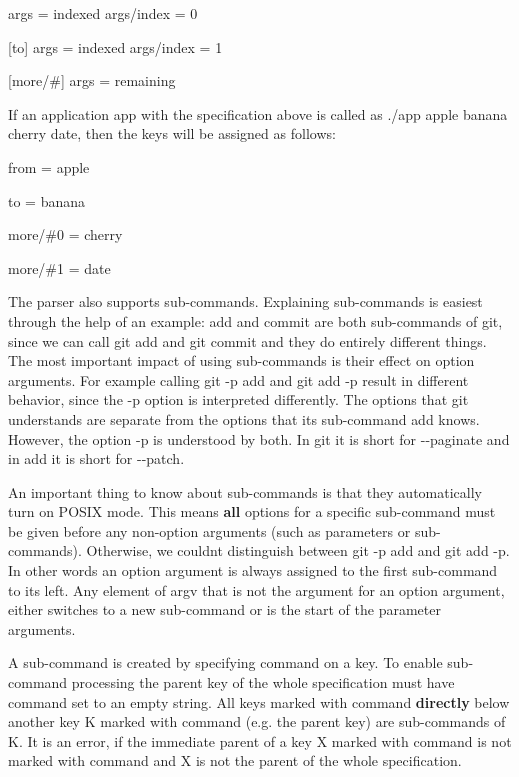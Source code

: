 \begin{DoxyCode}
[from]
args = indexed
args/index = 0

[to]
args = indexed
args/index = 1

[more/#]
args = remaining
\end{DoxyCode}


If an application {\ttfamily app} with the specification above is called as {\ttfamily ./app apple banana cherry date}, then the keys will be assigned as follows\+:


\begin{DoxyItemize}
\item {\ttfamily from = apple}
\item {\ttfamily to = banana}
\item {\ttfamily more/\#0 = cherry}
\item {\ttfamily more/\#1 = date}
\end{DoxyItemize}

The parser also supports sub-\/commands. Explaining sub-\/commands is easiest through the help of an example\+: {\ttfamily add} and {\ttfamily commit} are both sub-\/commands of {\ttfamily git}, since we can call {\ttfamily git add} and {\ttfamily git commit} and they do entirely different things. The most important impact of using sub-\/commands is their effect on option arguments. For example calling {\ttfamily git -\/p add} and {\ttfamily git add -\/p} result in different behavior, since the {\ttfamily -\/p} option is interpreted differently. The options that {\ttfamily git} understands are separate from the options that its sub-\/command {\ttfamily add} knows. However, the option {\ttfamily -\/p} is understood by both. In {\ttfamily git} it is short for {\ttfamily -\/-\/paginate} and in {\ttfamily add} it is short for {\ttfamily -\/-\/patch}.

An important thing to know about sub-\/commands is that they automatically turn on P\+O\+S\+IX mode. This means {\bfseries all} options for a specific sub-\/command must be given before any non-\/option arguments (such as parameters or sub-\/commands). Otherwise, we couldn\textquotesingle{}t distinguish between {\ttfamily git -\/p add} and {\ttfamily git add -\/p}. In other words an option argument is always assigned to the first sub-\/command to its left. Any element of {\ttfamily argv} that is not the argument for an option argument, either switches to a new sub-\/command or is the start of the parameter arguments.

A sub-\/command is created by specifying {\ttfamily command} on a key. To enable sub-\/command processing the parent key of the whole specification must have {\ttfamily command} set to an empty string. All keys marked with {\ttfamily command} {\bfseries directly} below another key {\ttfamily K} marked with {\ttfamily command} (e.\+g. the parent key) are sub-\/commands of {\ttfamily K}. It is an error, if the immediate parent of a key {\ttfamily X} marked with {\ttfamily command} is not marked with {\ttfamily command} and {\ttfamily X} is not the parent of the whole specification.

